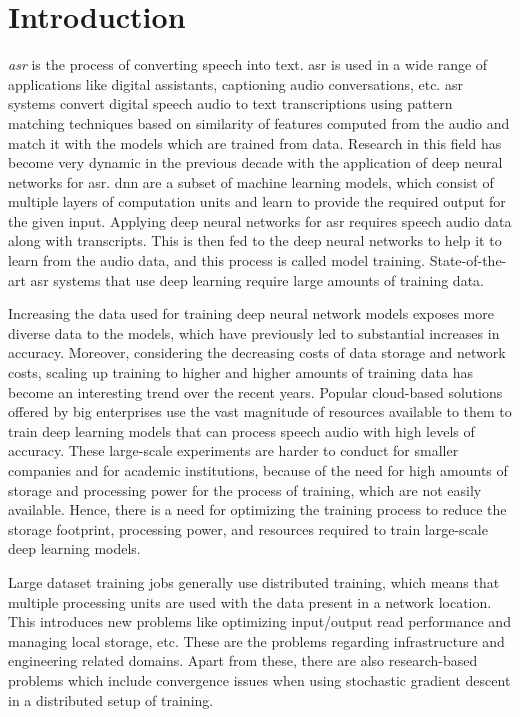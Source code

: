\chapter{Introduction}
\label{chapter:intro}
\emph{\acrfull{asr}} is the process of converting speech into text. \acrshort{asr} is used in a wide range of applications like digital assistants,  captioning audio conversations, etc. \acrshort{asr} systems convert digital speech audio to text transcriptions using pattern matching techniques based on similarity of features computed from the audio and match it with the models which are trained from data. Research in this field has become very dynamic in the previous decade with the application of deep neural networks for \acrshort{asr}. \acrfull{dnn} are a subset of machine learning models, which consist of multiple layers of computation units and learn to provide the required output for the given input. Applying deep neural networks for \acrshort{asr} requires speech audio data along with transcripts. This is then fed to the deep neural networks to help it to learn from the audio data, and this process is called model training. State-of-the-art \acrshort{asr} systems that use deep learning require large amounts of training data. 

Increasing the data used for training deep neural network models exposes more diverse data to the models, which have previously led to substantial increases in accuracy. Moreover, considering the decreasing costs of data storage and network costs\cite{Sayed2014ASecurity}, scaling up training to higher and higher amounts of training data has become an interesting trend over the recent years. Popular cloud-based solutions offered by big enterprises use the vast magnitude of resources available to them to train deep learning models that can process speech audio with high levels of accuracy\cite{Li2020OnRecognition}. These large-scale experiments are harder to conduct for smaller companies and for academic institutions, because of the need for high amounts of storage and processing power for the process of training, which are not easily available. Hence, there is a need for optimizing the training process to reduce the storage footprint, processing power, and resources required to train large-scale deep learning models.

Large dataset training jobs generally use distributed training, which means that multiple processing units are used with the data present in a network location. This introduces new problems like optimizing input/output read performance and managing local storage, etc. These are the problems regarding infrastructure and engineering related domains. Apart from these, there are also research-based problems which include convergence issues when using stochastic gradient descent in a distributed setup of training.  


